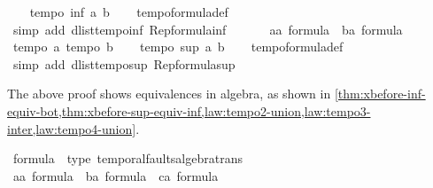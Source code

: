 \begin{isabellebody}
\ \ \isamarkupfalse%
\ {\isachardoublequoteopen}tempo{}\ {\isacharparenleft}inf\ a\ b{\isacharparenright}{\isachardoublequoteclose}\isanewline
\ \ \isamarkupfalse%
\ tempo{}{\isacharunderscore}formula{\isacharunderscore}def\isanewline
\ \ \isamarkupfalse%
\ {\isacharparenleft}simp\ add{\isacharcolon}\ dlist{\isacharunderscore}tempo{}{\isacharunderscore}inf\ Rep{\isacharunderscore}formula{\isacharunderscore}inf{\isacharparenright}\isanewline
\ \ \isamarkupfalse%
\isanewline
\ \ \isamarkupfalse%
\ a{\isacharcolon}{\isacharcolon}{\isachardoublequoteopen}{\isacharprime}a\ formula{\isachardoublequoteclose}\ \ b{\isacharcolon}{\isacharcolon}{\isachardoublequoteopen}{\isacharprime}a\ formula{\isachardoublequoteclose}\isanewline
\ \ \isamarkupfalse%
\ {\isachardoublequoteopen}tempo{}\ a{\isachardoublequoteclose}\ {\isachardoublequoteopen}tempo{}\ b{\isachardoublequoteclose}\isanewline
\ \ \isamarkupfalse%
\ {\isachardoublequoteopen}tempo{}\ {\isacharparenleft}sup\ a\ b{\isacharparenright}{\isachardoublequoteclose}\isanewline
\ \ \isamarkupfalse%
\ tempo{}{\isacharunderscore}formula{\isacharunderscore}def\ \isanewline
\ \ \isamarkupfalse%
\ {\isacharparenleft}simp\ add{\isacharcolon}\ dlist{\isacharunderscore}tempo{}{\isacharunderscore}sup\ Rep{\isacharunderscore}formula{\isacharunderscore}sup{\isacharparenright}\isanewline
{}\isamarkupfalse%
%
\endisatagproof
{\isafoldproof}%
%
\isadelimproof
%
\endisadelimproof
%
\begin{isamarkuptext}%
The above proof shows equivalences in \ac{algebra}, as shown in \cref{thm:xbefore-inf-equiv-bot,thm:xbefore-sup-equiv-inf,law:tempo2-union,law:tempo3-inter,law:tempo4-union}.%
\end{isamarkuptext}\isamarkuptrue%
\isamarkupfalse%
%
\isamarkuptrue%
\isamarkupfalse%
\ formula\ {\isacharcolon}{\isacharcolon}\ {\isacharparenleft}type{\isacharparenright}\ temporal{\isacharunderscore}faults{\isacharunderscore}algebra{\isacharunderscore}trans\isanewline
{}\isanewline
{}\isamarkupfalse%
%
\isadelimproof
\ %
\endisadelimproof
%
\isatagproof
{}\isamarkupfalse%
\isanewline
\ \ \isamarkupfalse%
\ a{\isacharcolon}{\isacharcolon}{\isachardoublequoteopen}{\isacharprime}a\ formula{\isachardoublequoteclose}\ \ b{\isacharcolon}{\isacharcolon}{\isachardoublequoteopen}{\isacharprime}a\ formula{\isachardoublequoteclose}\ \ c{\isacharcolon}{\isacharcolon}{\isachardoublequoteopen}{\isacharprime}a\ formula{\isachardoublequoteclose}\isanewline

\end{isabellebody}
